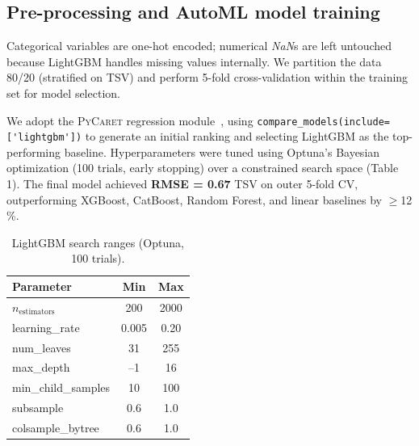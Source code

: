 \documentclass{article}
\theoremstyle{plain}
\theoremstyle{definition}
\theoremstyle{remark}
\begin{document}
\subsection{Pre-processing and AutoML model training}\label{ssec:prep}
Categorical variables are one-hot encoded; numerical \emph{NaN}s are left untouched because LightGBM handles missing values internally. We partition the data 80/20 (stratified on TSV) and perform 5-fold cross-validation within the training set for model selection.

We adopt the \textsc{PyCaret} regression module~\cite{pycaret2023}, using \verb|compare_models(include=['lightgbm'])| to generate an initial ranking and selecting LightGBM as the top-performing baseline. Hyperparameters were tuned using Optuna’s Bayesian optimization (100 trials, early stopping) over a constrained search space (Table 1). The final model achieved \textbf{RMSE = 0.67} TSV on outer 5-fold CV, outperforming XGBoost, CatBoost, Random Forest, and linear baselines by $\ge$12 \%.


\begin{table}[h]
\centering
\scriptsize
\vspace{-4pt}
\begin{tabular}{lcc}
\toprule
Parameter & Min & Max \\
\midrule
$n_{\text{estimators}}$   & 200  & 2000 \\
learning\_rate            & 0.005 & 0.20 \\
num\_leaves               & 31   & 255  \\
max\_depth                & –1   & 16   \\
min\_child\_samples       & 10   & 100  \\
subsample                 & 0.6  & 1.0  \\
colsample\_bytree         & 0.6  & 1.0  \\
\bottomrule
\end{tabular}
\vspace{-6pt}
\caption{LightGBM search ranges (Optuna, 100 trials).}\label{tab:lgbm_grid}
\end{table}

\end{document}
